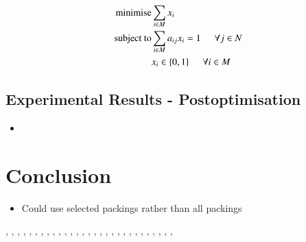 \documentclass{elsarticle}
\begin{document}
\begin{align*}
\text{minimise} &\sum_{i \in M} x_i \\
\text{subject to} &\sum_{i \in M} a_{ij} x_i = 1 \hspace{5mm} \forall j \in N \\
&x_i \in \{0,1\} \hspace{5mm} \forall i \in M
\end{align*}

\subsection{Experimental Results - Postoptimisation}
\label{sub:exppostopt}

{\color{myGreen}
\begin{itemize}
	\item
\end{itemize}
}

\section{Conclusion}
\label{sec:conclusion}

{\color{Orchid}
\begin{itemize}
	\item Could use selected packings rather than all packings
\end{itemize}
}

	

\cite{becker2010}, \cite{becker2015}, \cite{coffman1978}, \cite{coffman1984}, \cite{dosa2007} \cite{eilon1971} \cite{falkenauer1992} \cite{falkenauer1996}, \cite{garey1972}, \cite{garey1979}, \cite{garraffa2016}, \cite{gilmore1961}, \cite{gilmore1963}, \cite{goulimis2004}, \cite{haggkvist1977}, \cite{hawa2018}, \cite{hung1978}, \cite{johnson1973}, \cite{johnson1974fast}, \cite{johnson1974worst}, \cite{karp1972}, \cite{knuth2000}, \cite{korf2002}, \cite{levine2004}, \cite{lewis2009}, \cite{lewis2011}, \cite{lewis2017}, \cite{mahadev1994}, \cite{mahadev1995}, \cite{malaguti2008}, \cite{martello1990k}, \cite{martello1990l}, \cite{quiroz2015}



\end{document}
